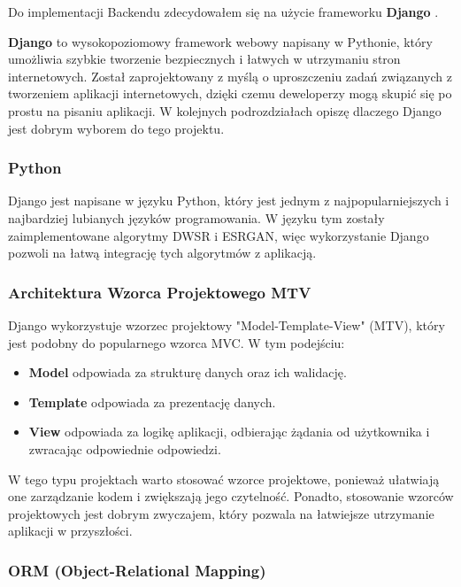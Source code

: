 Do implementacji Backendu zdecydowałem się na użycie frameworku \textbf{Django} \cite{django}.

\textbf{Django} to wysokopoziomowy framework webowy napisany w Pythonie, który umożliwia szybkie tworzenie bezpiecznych i łatwych w utrzymaniu stron internetowych. Został zaprojektowany z myślą o uproszczeniu zadań związanych z tworzeniem aplikacji internetowych, dzięki czemu deweloperzy mogą skupić się po prostu na pisaniu aplikacji. W kolejnych podrozdziałach opiszę dlaczego Django jest dobrym wyborem do tego projektu.


\subsubsection*{Python}

Django jest napisane w języku Python, który jest jednym z najpopularniejszych i najbardziej lubianych języków programowania. W języku tym zostały zaimplementowane algorytmy DWSR i ESRGAN, więc wykorzystanie Django pozwoli na łatwą integrację tych algorytmów z aplikacją.

\subsubsection*{Architektura Wzorca Projektowego MTV}

Django wykorzystuje wzorzec projektowy "Model-Template-View" (MTV), który jest podobny do popularnego wzorca MVC. W tym podejściu:
\begin{itemize}
    \item \textbf{Model} odpowiada za strukturę danych oraz ich walidację.
    \item \textbf{Template} odpowiada za prezentację danych.
    \item \textbf{View} odpowiada za logikę aplikacji, odbierając żądania od użytkownika i zwracając odpowiednie odpowiedzi.
\end{itemize}

W tego typu projektach warto stosować wzorce projektowe, ponieważ ułatwiają one zarządzanie kodem i zwiększają jego czytelność. Ponadto, stosowanie wzorców projektowych jest dobrym zwyczajem, który pozwala na łatwiejsze utrzymanie aplikacji w przyszłości.

\subsubsection*{ORM (Object-Relational Mapping)}

